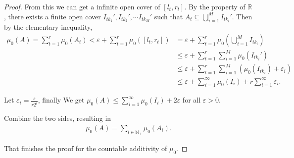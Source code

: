 \begin{proof}[Proof]
    From this we can get a infinite open cover of $[l_t, r_t]$. By the property of $\mathbb{R} $, there exists a finite open cover $I_{tk_1}', I_{tk_2}',\cdots I_{tk_M}'$ such that $A_t \subseteq \bigcup_{i=1}^M I_{tk_i}'$. Then by the elementary inequality, 
    \begin{align*}
        \mu_0(A) = \sum_{t=1}^r \mu_0(A_t) < \varepsilon + \sum_{t=1}^r \mu_0([l_t, r_t]) &= \varepsilon + \sum_{t=1}^r \mu_0(\bigcup_{i=1}^M I_{tk_i}) \\
                                                                                          &\le \varepsilon + \sum_{t=1}^r \sum_{i=1}^M \mu_0(I_{tk_i}')  \\
                                                                                          &\le \varepsilon + \sum_{t=1}^r \sum_{i=1}^M (\mu_0(I_{tk_i}) + \varepsilon_i)  \\
                                                                                          &\le \varepsilon + \sum_{i=1}^\infty \mu_0(I_i) + r\sum_{i=1}^\infty \varepsilon_i
   .\end{align*}

   Let $\varepsilon _i = \frac{\varepsilon}{r2^i}$, finally We get $\mu_0(A) \le \sum _{i=1}^\infty \mu_0(I_i) + 2\varepsilon $ for all $\varepsilon > 0$.

   Combine the two sides, resulting in 
    \begin{align*}
        \mu_0(A) = \sum _{i\in\mathbb{N} _+} \mu_0(A_i)
    .\end{align*}

    That finishes the proof for the countable additivity of $\mu_0$.

\end{proof}



